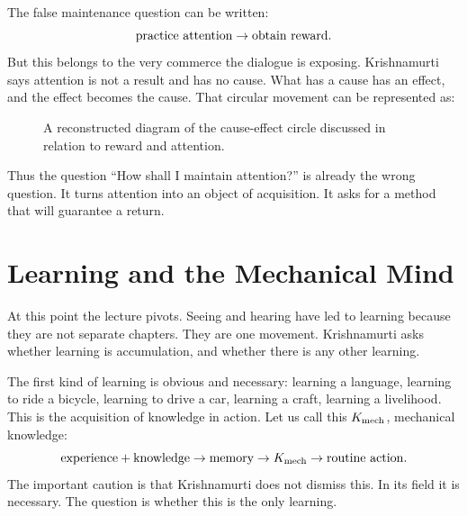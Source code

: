 The false maintenance question can be written:
\begin{equation}
\hbox{practice attention}
\to
\hbox{obtain reward}.
\end{equation}
But this belongs to the very commerce the dialogue is exposing. Krishnamurti says attention is not a result and has no cause. What has a cause has an effect, and the effect becomes the cause. That circular movement can be represented as:
\begin{figure}
\centering
{}
\caption{A reconstructed diagram of the cause-effect circle discussed in relation to reward and attention.}
\end{figure}

Thus the question ``How shall I maintain attention?'' is already the wrong question. It turns attention into an object of acquisition. It asks for a method that will guarantee a return.

\section{Learning and the Mechanical Mind}

At this point the lecture pivots. Seeing and hearing have led to learning because they are not separate chapters. They are one movement. Krishnamurti asks whether learning is accumulation, and whether there is any other learning.

The first kind of learning is obvious and necessary: learning a language, learning to ride a bicycle, learning to drive a car, learning a craft, learning a livelihood. This is the acquisition of knowledge in action. Let us call this \(K_{\rm mech}\), mechanical knowledge:
\begin{equation}
\hbox{experience}+\hbox{knowledge}
\to
\hbox{memory}
\to
K_{\rm mech}
\to
\hbox{routine action}.
\end{equation}
The important caution is that Krishnamurti does not dismiss this. In its field it is necessary. The question is whether this is the only learning.

